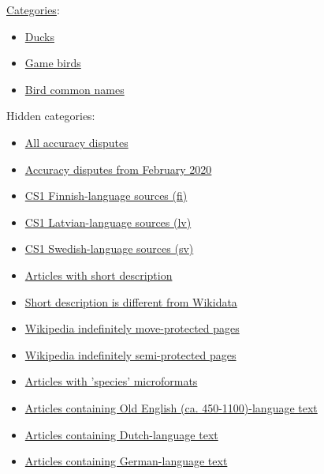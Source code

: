 \documentclass[11pt,a4paper]{article}
\begin{document}
\href{/wiki/Help:Category}{Categories}:

\begin{itemize}
\item \href{/wiki/Category:Ducks}{Ducks}
\item \href{/wiki/Category:Game\_birds}{Game birds}
\item \href{/wiki/Category:Bird\_common\_names}{Bird common names}
\end{itemize}

Hidden categories:

\begin{itemize}
\item \href{/wiki/Category:All\_accuracy\_disputes}{All accuracy disputes}
\item \href{/wiki/Category:Accuracy\_disputes\_from\_February\_2020}{Accuracy disputes from February 2020}
\item \href{/wiki/Category:CS1\_Finnish-language\_sources\_\%28fi\%29}{CS1 Finnish-language sources (fi)}
\item \href{/wiki/Category:CS1\_Latvian-language\_sources\_\%28lv\%29}{CS1 Latvian-language sources (lv)}
\item \href{/wiki/Category:CS1\_Swedish-language\_sources\_\%28sv\%29}{CS1 Swedish-language sources (sv)}
\item \href{/wiki/Category:Articles\_with\_short\_description}{Articles with short description}
\item \href{/wiki/Category:Short\_description\_is\_different\_from\_Wikidata}{Short description is different from Wikidata}
\item \href{/wiki/Category:Wikipedia\_indefinitely\_move-protected\_pages}{Wikipedia indefinitely move-protected pages}
\item \href{/wiki/Category:Wikipedia\_indefinitely\_semi-protected\_pages}{Wikipedia indefinitely semi-protected pages}
\item \href{/wiki/Category:Articles\_with\_\%27species\%27\_microformats}{Articles with 'species' microformats}
\item \href{/wiki/Category:Articles\_containing\_Old\_English\_\%28ca.\_450-1100\%29-language\_text}{Articles containing Old English (ca. 450-1100)-language text}
\item \href{/wiki/Category:Articles\_containing\_Dutch-language\_text}{Articles containing Dutch-language text}
\item \href{/wiki/Category:Articles\_containing\_German-language\_text}{Articles containing German-language text}

\end{itemize}
\end{document}
